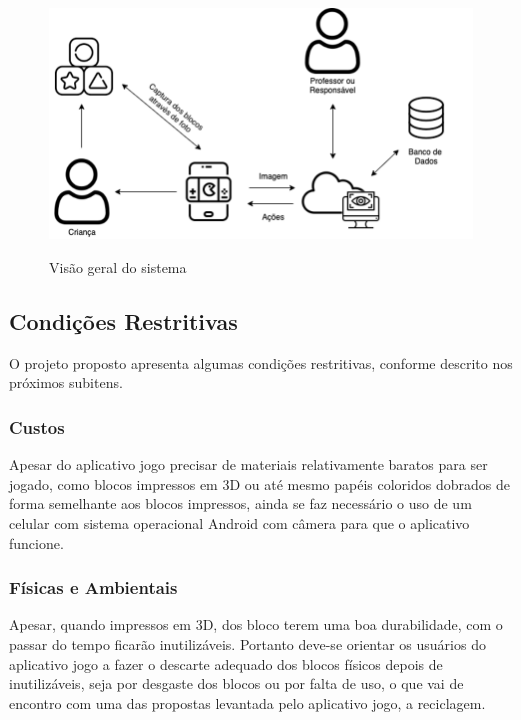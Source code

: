     \begin{figure}[H]
        \caption{Visão geral do sistema}
        \centering
        \includegraphics[width=\linewidth]{Imagens/cap3/diagrama_blocos.png}
        \label{figura:diagrama_blocos}
    \end{figure}
    
    \subsection{Condições Restritivas}
    O projeto proposto apresenta algumas condições restritivas, conforme descrito
    nos próximos subitens.

        \subsubsection{Custos}
        Apesar do aplicativo jogo precisar de materiais relativamente baratos para ser jogado, como blocos impressos em 3D ou até mesmo papéis coloridos dobrados de forma semelhante aos blocos impressos, ainda se faz necessário o uso de um celular com sistema operacional Android com câmera para que o aplicativo funcione. 
            
        \subsubsection{Físicas e Ambientais}
        Apesar, quando impressos em 3D, dos bloco terem uma boa durabilidade, com o passar do tempo ficarão inutilizáveis. Portanto deve-se orientar os usuários do aplicativo jogo a fazer o descarte adequado dos blocos físicos depois de inutilizáveis, seja por desgaste dos blocos ou por falta de uso, o que vai de encontro com uma das propostas levantada pelo aplicativo jogo, a reciclagem.
        
